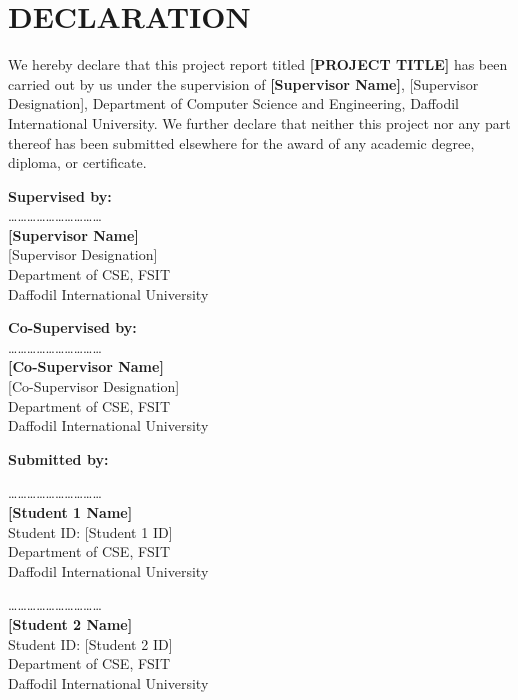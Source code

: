 \cleardoublepage
\section*{DECLARATION}

We hereby declare that this project report titled \textbf{[PROJECT TITLE]} has been carried out by us under the supervision of \textbf{[Supervisor Name]}, [Supervisor Designation], Department of Computer Science and Engineering, Daffodil International University. We further declare that neither this project nor any part thereof has been submitted elsewhere for the award of any academic degree, diploma, or certificate.

\vspace{1.5cm}
\begin{minipage}{0.48\textwidth}
\textbf{Supervised by:}\\[0.5cm]
\dots\dots\dots\dots\dots\dots\dots\dots\dots\dots\\
{\textbf{[Supervisor Name]}}\\[0.05cm]
{[Supervisor Designation]}\\[0.05cm]
Department of CSE, FSIT\\
Daffodil International University
\end{minipage}
\hfill
\begin{minipage}{0.48\textwidth}
\textbf{Co-Supervised by:}\\[0.5cm]
\dots\dots\dots\dots\dots\dots\dots\dots\dots\dots\\
{\textbf{[Co-Supervisor Name]}}\\[0.05cm]
{[Co-Supervisor Designation]}\\[0.05cm]
Department of CSE, FSIT\\
Daffodil International University
\end{minipage}

\vspace{2cm}
\noindent\textbf{Submitted by:}

\vspace{1cm}
\begin{minipage}{0.48\textwidth}
\dots\dots\dots\dots\dots\dots\dots\dots\dots\dots\\
{\textbf{[Student 1 Name]}}\\[0.05cm]
Student ID: [Student 1 ID] \\
Department of CSE, FSIT\\
Daffodil International University
\end{minipage}
\hfill
\begin{minipage}{0.48\textwidth}
\dots\dots\dots\dots\dots\dots\dots\dots\dots\dots\\
{\textbf{[Student 2 Name]}}\\[0.05cm]
Student ID: [Student 2 ID]\\
Department of CSE, FSIT\\
Daffodil International University
\end{minipage}

